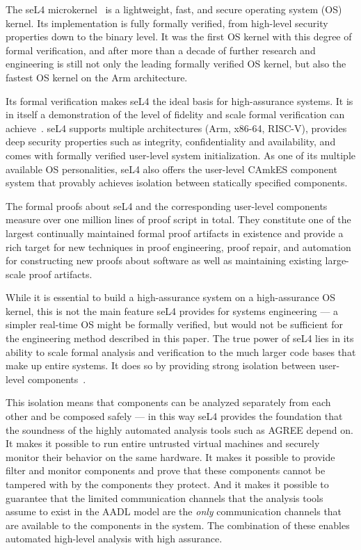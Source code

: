 
The seL4 microkernel~\cite{sel4-sosp09} is a lightweight, fast, and secure
operating system (OS) kernel. Its implementation is fully formally verified,
from high-level security properties down to the binary level. It was the first
OS kernel with this degree of formal verification, and after more than a decade
of further research and engineering is still not only the leading formally
verified OS kernel, but also the fastest OS kernel on the Arm architecture.

Its formal verification makes seL4 the ideal basis for high-assurance systems.
It is in itself a demonstration of the level of fidelity and scale formal
verification can achieve~\cite{sel4-tocs14}. seL4 supports multiple architectures
(Arm, x86-64, RISC-V), provides deep security properties such as integrity,
confidentiality and availability, and comes with formally verified user-level
system initialization. As one of its multiple available OS personalities, seL4 
also offers the user-level CAmkES component system that provably achieves isolation
between statically specified components.

The formal proofs about seL4 and the corresponding user-level components measure
over one million lines of proof script in total. They constitute one of the
largest continually maintained formal proof artifacts in existence and provide a
rich target for new techniques in proof engineering, proof repair, and
automation for constructing new proofs about software as well as maintaining
existing large-scale proof artifacts.

While it is essential to build a high-assurance system on a high-assurance OS
kernel, this is not the main feature seL4 provides for systems engineering --- a
simpler real-time OS might be formally verified, but would not be sufficient for the
engineering method described in this paper. The true power of seL4 lies in its
ability to scale formal analysis and verification to the much larger code bases
that make up entire systems. It does so by providing strong isolation between
user-level components~\cite{sel4-cacm18}.

This isolation means that components can be analyzed separately from each other
and be composed safely --- in this way seL4 provides the foundation that the soundness of the highly
automated analysis tools such as AGREE depend on. It makes it possible to run
entire untrusted virtual machines and securely monitor their behavior on the
same hardware. It makes it possible to provide filter and monitor components and
prove that these components cannot be tampered with by the components they protect.
And it makes it possible to guarantee that the limited communication channels that the analysis tools
assume to exist in the AADL model are the \emph{only} communication channels that are available to the
components in the system. The combination of these enables automated
high-level analysis with high assurance.

